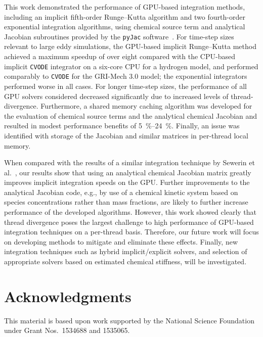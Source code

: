 \documentclass[preprint]{elsarticle}
\begin{document}
This work demonstrated the performance of GPU-based integration methods, including an implicit fifth-order Runge--Kutta algorithm and two fourth-order exponential integration algorithms, using chemical source term and analytical Jacobian subroutines provided by the \texttt{pyJac} software~\cite{Niemeyer:2015im}.
For time-step sizes relevant to large eddy simulations, the GPU-based implicit Runge--Kutta method achieved a maximum speedup of over eight compared with the CPU-based implicit \texttt{CVODE} integrator on a six-core CPU for a hydrogen model, and performed comparably to \texttt{CVODE} for the GRI-Mech 3.0 model; the exponential integrators performed worse in all cases.
For longer time-step sizes, the performance of all GPU solvers considered decreased significantly due to increased levels of thread-divergence.
Furthermore, a shared memory caching algorithm was developed for the evaluation of chemical source terms and the analytical chemical Jacobian and resulted in modest performance benefits of \SIrange{5}{24}{\percent}.
Finally, an issue was identified with storage of the Jacobian and similar matrices in per-thread local memory.

When compared with the results of a similar integration technique by Sewerin et al.~\cite{Sewerin20151375}, our results show that using an analytical chemical Jacobian matrix greatly improves implicit integration speeds on the GPU.
Further improvements to the analytical Jacobian code, e.g., by use of a chemical kinetic system based on species concentrations rather than mass fractions, are likely to further increase performance of the developed algorithms.
However, this work showed clearly that thread divergence poses the largest challenge to high performance of GPU-based integration techniques on a per-thread basis.
Therefore, our future work will focus on developing methods to mitigate and eliminate these effects.
Finally, new integration techniques such as hybrid implicit\slash explicit solvers, and selection of appropriate solvers based on estimated chemical stiffness, will be investigated.


\section*{Acknowledgments}

This material is based upon work supported by the National Science Foundation under Grant Nos.~1534688 and 1535065.



\end{document}
